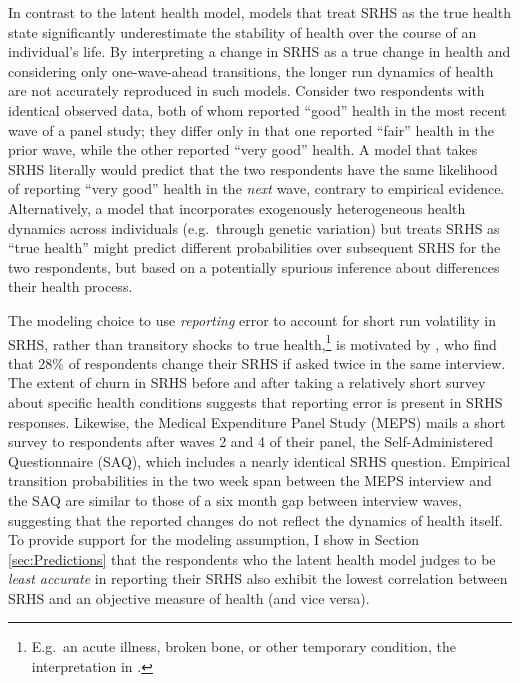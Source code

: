 \documentclass[12pt,pdftex,letterpaper]{article}
\begin{document}
In contrast to the latent health model, models that treat SRHS as the true health state significantly underestimate the stability of health over the course of an individual's life. By interpreting a change in SRHS as a true change in health and considering only one-wave-ahead transitions, the longer run dynamics of health are not accurately reproduced in such models. Consider two respondents with identical observed data, both of whom reported ``good'' health in the most recent wave of a panel study; they differ only in that one reported ``fair'' health in the prior wave, while the other reported ``very good'' health. A model that takes SRHS literally would predict that the two respondents have the same likelihood of reporting ``very good'' health in the \textit{next} wave, contrary to empirical evidence. Alternatively, a model that incorporates exogenously heterogeneous health dynamics across individuals (e.g.\ through genetic variation) but treats SRHS as ``true health'' might predict different probabilities over subsequent SRHS for the two respondents, but based on a potentially spurious inference about differences their health process.

The modeling choice to use \textit{reporting} error to account for short run volatility in SRHS, rather than transitory shocks to true health,\footnote{E.g.\ an acute illness, broken bone, or other temporary condition, the interpretation in \cite{Halliday11}.} is motivated by \cite{Crossley02}, who find that 28\% of respondents change their SRHS if asked twice in the same interview.  The extent of churn in SRHS before and after taking a relatively short survey about specific health conditions suggests that reporting error is present in SRHS responses. Likewise, the Medical Expenditure Panel Study (MEPS) mails a short survey to respondents after waves 2 and 4 of their panel, the Self-Administered Questionnaire (SAQ), which includes a nearly identical SRHS question. Empirical transition probabilities in the two week span between the MEPS interview and the SAQ are similar to those of a six month gap between interview waves, suggesting that the reported changes do not reflect the dynamics of health itself. To provide support for the modeling assumption, I show in Section \ref{sec:Predictions} that the respondents who the latent health model judges to be \textit{least accurate} in reporting their SRHS also exhibit the lowest correlation between SRHS and an objective measure of health (and vice versa).
\end{document}
